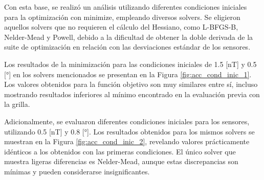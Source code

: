Con esta base, se realizó un análisis utilizando diferentes condiciones iniciales para la optimización con minimize, empleando diversos solvers. Se eligieron aquellos solvers que no requieren el cálculo del Hessiano, como L-BFGS-B, Nelder-Mead y Powell, debido a la dificultad de obtener la doble derivada de la suite de optimización en relación con las desviaciones estándar de los sensores.

Los resultados de la minimización para las condiciones iniciales de 1.5 [nT] y 0.5 [°] en los solvers mencionados se presentan en la Figura \ref{fig:acc_cond_inic_1}. Los valores obtenidos para la función objetivo son muy similares entre sí, incluso mostrando resultados inferiores al mínimo encontrado en la evaluación previa con la grilla.

Adicionalmente, se evaluaron diferentes condiciones iniciales para los sensores, utilizando 0.5 [nT] y 0.8 [°]. Los resultados obtenidos para los mismos solvers se muestran en la Figura \ref{fig:acc_cond_inic_2},  revelando valores prácticamente idénticos a los obtenidos con las primeras condiciones. El único solver que muestra ligeras diferencias es Nelder-Mead, aunque estas discrepancias son mínimas y pueden considerarse insignificantes.

